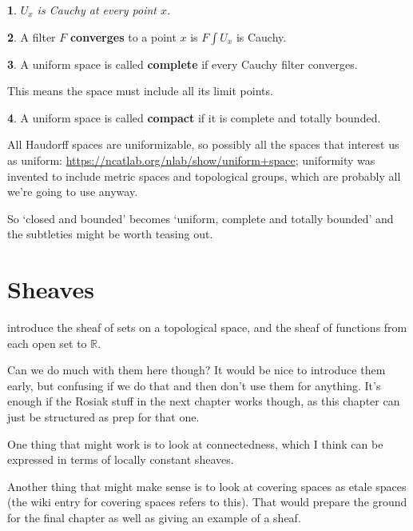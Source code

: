 \documentclass[oneside,english]{amsbook}
\numberwithin{section}{chapter}
\theoremstyle{plain}
\newtheorem{thm}{\protect\theoremname}
\theoremstyle{definition}
\newtheorem{defn}[thm]{\protect\definitionname}
\providecommand{\definitionname}{Definition}
\providecommand{\theoremname}{Theorem}
\begin{document}
\begin{thm}
	$U_x$ is Cauchy at every point $x$.
\end{thm}

\begin{defn}
	A filter $F$ \textbf{converges} to a point $x$ is $F\int U_x$ is Cauchy.
\end{defn}

\begin{defn}
	A uniform space is called \textbf{complete} if every Cauchy filter converges.
\end{defn}

This means the space must include all its limit points. 

\begin{defn}
	A uniform space is called \textbf{compact} if it is complete and totally bounded.
\end{defn}

All Haudorff spaces are uniformizable, so possibly all the spaces that interest us as uniform: \url{https://ncatlab.org/nlab/show/uniform+space}; uniformity was invented to include metric spaces and topological groups, which are probably all we're going to use anyway. 

So `closed and bounded' becomes `uniform, complete and totally bounded' and the subtleties might be worth teasing out.


\chapter{Sheaves}

	introduce the sheaf of sets on a topological space, and the sheaf of functions from each open set to $\mathbb{R}$.
	
	Can we do much with them here though? It would be nice to introduce them early, but confusing if we do that and then don't use them for anything. It's enough if the Rosiak stuff in the next chapter works though, as this chapter can just be structured as prep for that one.
	
	One thing that might work is to look at connectedness, which I think can be expressed in terms of locally constant sheaves.
	
	Another thing that might make sense is to look at covering spaces as etale spaces (the wiki entry for covering spaces refers to this). That would prepare the ground for the final chapter as well as giving an example of a sheaf.
\end{document}
